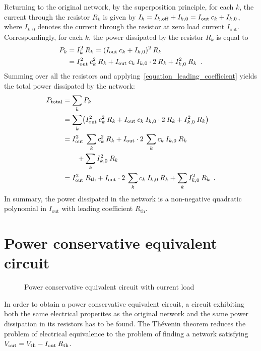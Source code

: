 \documentclass[twoside]{IEEEtran}
\newcommand{\mult}{\nonscript\:}
\newcommand{\opoff}{{\operatorname{off}}}
\newcommand{\opout}{{\operatorname{out}}}
\newcommand{\opth}{{\operatorname{th}}}
\newcommand{\optotal}{{\operatorname{total}}}
\begin{document}
Returning to the original network, by the superposition principle, for each $k$, the current through the resistor $R_{k}$ is given by $I_{k} = I_{k, \opoff} + I_{k, 0} = I_{\opout} \mult c_{k} + I_{k, 0}$, where $I_{k, 0}$ denotes the current through the resistor at zero load current $I_{\opout}$.
Correspondingly, for each $k$, the power dissipated by the resistor $R_{k}$ is equal to
\begin{align*}
         P_{k}
     & = I_{k}^{2} \mult R_{k}
       = (I_{\opout} \mult c_{k} + I_{k, 0})^{2} \mult R_{k}
  \\ & = I_{\opout}^{2} \mult c_{k}^{2} \mult R_{k} + I_{\opout} \mult c_{k} \mult I_{k, 0} \cdot 2 \mult R_{k} + I_{k, 0}^{2} \mult R_{k}
  \enskip.
\end{align*}
Summing over all the resistors and applying~\eqref{equation_leading_coefficient} yields the total power dissipated by the network:
\begin{align}
         P_{\optotal}
     & = \sum_{k} P_{k}
  \nonumber \\ & = \sum_{k} \bigl( I_{\opout}^{2} \mult c_{k}^{2} \mult R_{k} + I_{\opout} \mult c_{k} \mult I_{k, 0} \cdot 2 \mult R_{k} + I_{k, 0}^{2} \mult R_{k} \bigr)
  \nonumber \\ & = I_{\opout}^{2} \mult \sum_{k} c_{k}^{2} \mult R_{k} + I_{\opout} \cdot 2 \mult \sum_{k} c_{k} \mult I_{k, 0} \mult R_{k} \nonumber \\ & \qquad + \sum_{k} I_{k, 0}^{2} \mult R_{k}
  \nonumber \\ & = I_{\opout}^{2} \mult R_{\opth} + I_{\opout} \cdot 2 \mult \sum_{k} c_{k} \mult I_{k, 0} \mult R_{k} + \sum_{k} I_{k, 0}^{2} \mult R_{k}
  \enskip.
  \label{equation_power_total}
\end{align}
In summary, the power dissipated in the network is a non-negative quadratic polynomial in $I_{\opout}$ with leading coefficient $R_{\opth}$.

\section{Power conservative equivalent circuit}
\label{section_circuit}

\begin{figure}
  \centering
  
  \caption{Power conservative equivalent circuit with current load}
  \label{equivalent_circuit}
\end{figure}

In order to obtain a power conservative equivalent circuit, a circuit exhibiting both the same electrical properites as the original network and the same power dissipation in its resistors has to be found.
The Th\'{e}venin theorem reduces the problem of electrical equivalence to the problem of finding a network satisfying $V_{\opout} = V_{\opth} - I_{\opout} \mult R_{\opth}$.
\end{document}
